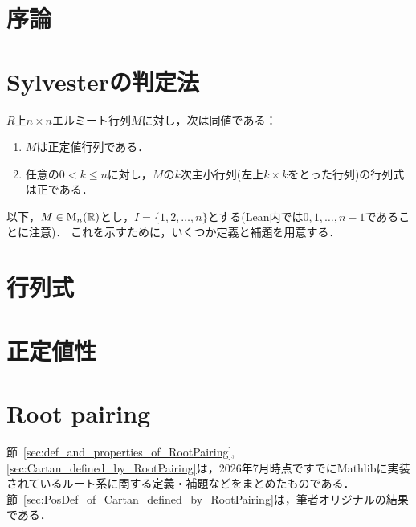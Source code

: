 \section{序論}


\section{Sylvesterの判定法}

\begin{theorem}[Sylvesterの判定法]
  \label{thm:sylvester_criterion}
  \leanok
  $R$上$n \times n$エルミート行列$M$に対し，次は同値である：
  \begin{enumerate}[label=(\arabic*)]
    \item $M$は正定値行列である．\label{enu:Sylvester_posdef}
    \item 任意の$0 < k \le n$に対し，$M$の$k$次主小行列(左上$k \times k$をとった行列)の行列式は正である．\label{enu:Sylvester_det}
  \end{enumerate}
\end{theorem}

以下，$M \in \operatorname{M}_n(\mathbb{R})$とし，$I = \{1, 2, \ldots, n\}$とする(Lean内では$0, 1, \ldots, n - 1$であることに注意)．
これを示すために，いくつか定義と補題を用意する．




\section{行列式}





\section{正定値性}



\section{Root pairing}
節~\ref{sec:def_and_properties_of_RootPairing}, \ref{sec:Cartan_defined_by_RootPairing}は，2026年7月時点ですでにMathlibに実装されているルート系に関する定義・補題などをまとめたものである．
節~\ref{sec:PosDef_of_Cartan_defined_by_RootPairing}は，筆者オリジナルの結果である．

